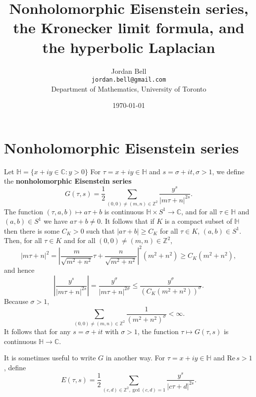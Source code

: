 \documentclass{article}
\def\Re{\ensuremath{\mathrm{Re}}\,}
\theoremstyle{definition}
\begin{document}
\title{Nonholomorphic Eisenstein series, the Kronecker limit formula, and the hyperbolic Laplacian}
\author{Jordan Bell\\ \texttt{jordan.bell@gmail.com}\\Department of Mathematics, University of Toronto}
\date{\today}

\maketitle


\section{Nonholomorphic Eisenstein series}
Let $\mathbb{H} = \{x+iy \in \mathbb{C}: y>0\}$
For $\tau=x+iy \in \mathbb{H}$ and $s=\sigma+it, \sigma>1$, we define the \textbf{nonholomorphic Eisenstein series}
\[
G(\tau,s) = \frac{1}{2} \sum_{(0,0) \neq (m,n) \in \mathbb{Z}^2} \frac{y^s}{|m\tau+n|^{2s}}.
\]
The function $(\tau,a,b) \mapsto a\tau+b$ is continuous $\mathbb{H} \times
S^1 \to \mathbb{C}$, and for all $\tau \in\mathbb{H}$ and $(a,b) \in S^1$ we have $a\tau+b \neq 0$. 
It follows that if $K$ is a compact subset of $\mathbb{H}$ then there is some $C_K>0$ such that
$|a\tau+b| \geq C_K$ for all $\tau \in K$, $(a,b) \in S^1$. Then, for all $\tau \in K$ and for all
$(0,0) \neq (m,n) \in \mathbb{Z}^2$,
\[
|m\tau+n|^2=\left| \frac{m}{\sqrt{m^2+n^2}}\tau+\frac{n}{\sqrt{m^2+n^2}}\right|^2 (m^2+n^2) 
\geq C_K (m^2+n^2),
\]
and hence
\[
\left|  \frac{y^s}{|m\tau+n|^{2s}} \right|=\frac{y^\sigma}{|m\tau+n|^{2\sigma}}
\leq \frac{y^\sigma}{(C_K(m^2+n^2))^{\sigma}}.
\]
Because $\sigma>1$,
\[
\sum_{(0,0) \neq (m,n) \in \mathbb{Z}^2} \frac{1}{(m^2+n^2)^\sigma}<\infty.
\]
It follows that for any $s=\sigma+it$ with $\sigma>1$, the function
$\tau \mapsto G(\tau,s)$ is continuous $\mathbb{H} \to \mathbb{C}$. 

It is sometimes useful to write $G$ in another way. For $\tau=x+iy \in \mathbb{H}$ and $\Re s>1$, define
\[
E(\tau,s) = \frac{1}{2} \sum_{(c,d) \in \mathbb{Z}^2, \gcd(c,d)=1} \frac{y^s}{|c\tau+d|^{2s}}.
\]
\end{document}
